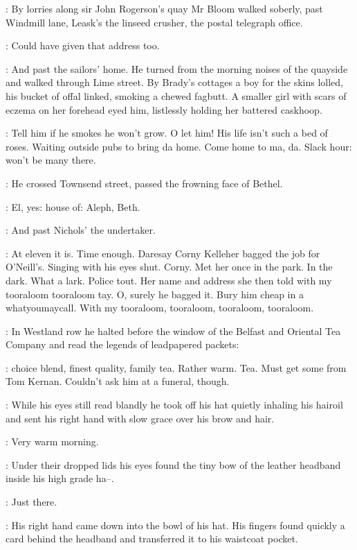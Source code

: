 :
By lorries along sir John Rogerson's quay
Mr Bloom walked soberly,
past Windmill lane,
Leask's the linseed crusher,
the postal telegraph office.

\BloomInt:
Could have given that address too.

:
And past the sailors' home.
He turned from the morning noises of the quayside
and walked through Lime street.
By Brady's cottages
a boy for the skins lolled,
his bucket of offal linked,
smoking a chewed fagbutt.
A smaller girl with scars of eczema on her forehead
eyed him,
listlessly holding her battered caskhoop.

\BloomInt:
Tell him if he smokes he won't grow.
O let him!
His life isn't such a bed of roses.
Waiting outside pubs to bring da home.
Come home to ma, da.
Slack hour: won't be many there.

:
He crossed Townsend street,
passed the frowning face of Bethel.

\BloomInt:
El, yes:
house of: Aleph, Beth.

:
And past Nichols' the undertaker.

\BloomInt:
At eleven it is.
Time enough.
Daresay Corny Kelleher bagged the job for O'Neill's.
Singing with his eyes shut.
Corny.
Met her once in the park.
In the dark.
What a lark.
Police tout.
Her name and address she then told
with my tooraloom tooraloom tay.
O, surely he bagged it.
Bury him cheap in a whatyoumaycall.
With my tooraloom, tooraloom, tooraloom, tooraloom.

:
In Westland row
he halted before the window of the Belfast and Oriental Tea Company
and read the legends of leadpapered packets:

\BloomInt:
choice blend, finest quality, family tea.
Rather warm.
Tea.
Must get some from Tom Kernan.
Couldn't ask him at a funeral, though.

:
While his eyes still read blandly
he took off his hat
quietly inhaling his hairoil
and sent his right hand with slow grace over his brow and hair.

\BloomInt:
Very warm morning.

:
Under their dropped lids
his eyes found the tiny bow of the leather headband inside his high grade ha--.

\BloomInt:
Just there.

:
His right hand came down into the bowl of his hat.
His fingers found quickly a card behind the headband
and transferred it to his waistcoat pocket.

